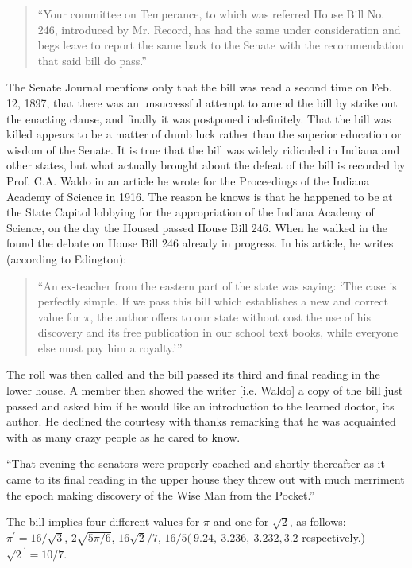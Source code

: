 \begin{quote}
  ``Your committee on Temperance, to which was referred House Bill
  No. 246, introduced by Mr. Record, has had the same under
  consideration and begs leave to report the same back to the Senate
  with the recommendation that said bill do pass.''
\end{quote}

The Senate Journal mentions only that the bill was read a second time on
Feb. 12, 1897, that there was an unsuccessful attempt to amend the bill
by strike out the enacting clause, and finally it was postponed
indefinitely.  That the bill was killed appears to be a matter of dumb
luck rather than the superior education or wisdom of the Senate. It is
true that the bill was widely ridiculed in Indiana and other states, but
what actually brought about the defeat of the bill is recorded by
Prof. C.A. Waldo in an article he wrote for the Proceedings of the
Indiana Academy of Science in 1916. The reason he knows is that he
happened to be at the State Capitol lobbying for the appropriation of
the Indiana Academy of Science, on the day the Housed passed House Bill
246. When he walked in the found the debate on House Bill 246 already in
progress. In his article, he writes (according to Edington):

\begin{quote}
  ``An ex-teacher from the eastern part of the state was saying: `The
  case is perfectly simple. If we pass this bill which establishes a new
  and correct value for $\pi$, the author offers to our state without
  cost the use of his discovery and its free publication in our school
  text books, while everyone else must pay him a royalty.'{}''
\end{quote}

The roll was then called and the bill passed its third and final reading
in the lower house. A member then showed the writer [i.e. Waldo] a copy
of the bill just passed and asked him if he would like an introduction
to the learned doctor, its author. He declined the courtesy with thanks
remarking that he was acquainted with as many crazy people as he cared
to know.

``That evening the senators were properly coached and shortly thereafter
as it came to its final reading in the upper house they threw out with
much merriment the epoch making discovery of the Wise Man from the
Pocket.''


The bill implies four different values for $\pi$ and one for $\sqrt{2}$,
as follows: $\pi^\prime = 16/\sqrt{3}$, $2\sqrt{5\pi/6}$,
$16\sqrt{2}/7$, $16/5 (~9.24, ~3.236, ~3.232, 3.2$ respectively.)
$\sqrt{2}^\prime = 10/7.$

